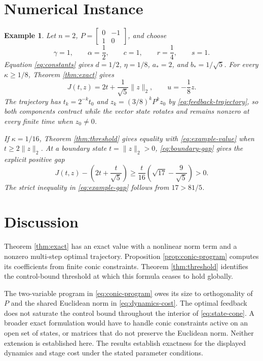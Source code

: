 \documentclass[10pt]{article}
\newtheorem{example}{Example}
\begin{document}
\section{Numerical Instance}

\begin{example}
Let $n=2$, $P=\begin{bmatrix}0&-1\\1&0\end{bmatrix}$, and choose
\begin{equation}
\gamma=1,\qquad \alpha=\frac12,\qquad
c=1,\qquad r=\frac14,\qquad s=1.
\label{eq:example-data}
\end{equation}
Equation \eqref{eq:constants} gives $d=1/2$, $\eta=1/8$, $a_*=2$, and $b_*=1/\sqrt5$. For every $\kappa\geq1/8$, Theorem \ref{thm:exact} gives
\begin{equation}
J(t,z)=2t+\frac{1}{\sqrt5}\|z\|_2,
\qquad u=-\frac18z.
\label{eq:example-value}
\end{equation}
The trajectory has $t_k=2^{-k}t_0$ and $z_k=(3/8)^kP^kz_0$ by \eqref{eq:feedback-trajectory}, so both components contract while the vector state rotates and remains nonzero at every finite time when $z_0\ne0$.

If $\kappa=1/16$, Theorem \ref{thm:threshold} gives equality with \eqref{eq:example-value} when $t\geq2\|z\|_2$. At a boundary state $t=\|z\|_2>0$, \eqref{eq:boundary-gap} gives the explicit positive gap
\begin{equation}
J(t,z)-\left(2t+\frac{t}{\sqrt5}\right)
\geq\frac{t}{16}\left(\sqrt{17}-\frac9{\sqrt5}\right)>0.
\label{eq:example-gap}
\end{equation}
The strict inequality in \eqref{eq:example-gap} follows from $17>81/5$.
\end{example}

\section{Discussion}

Theorem \ref{thm:exact} has an exact value with a nonlinear norm term and a nonzero multi-step optimal trajectory. Proposition \ref{prop:conic-program} computes its coefficients from finite conic constraints. Theorem \ref{thm:threshold} identifies the control-bound threshold at which this formula ceases to hold globally.

The two-variable program in \eqref{eq:conic-program} owes its size to orthogonality of $P$ and the shared Euclidean norm in \eqref{eq:dynamics-cost}. The optimal feedback does not saturate the control bound throughout the interior of \eqref{eq:state-cone}. A broader exact formulation would have to handle conic constraints active on an open set of states, or matrices that do not preserve the Euclidean norm. Neither extension is established here. The results establish exactness for the displayed dynamics and stage cost under the stated parameter conditions.
\end{document}
